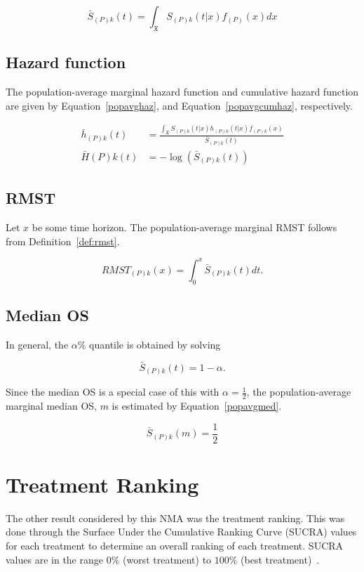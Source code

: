 \begin{equation}
    \bar{S}_{(P)k}(t) = \int_{\mathfrak{X}}S_{(P)k}(t|x)f_{(P)}(x)dx
    \label{popavgS}
\end{equation}

\subsection{Hazard function}

The population-average marginal hazard function and cumulative hazard function are given by Equation~\ref{popavghaz}, and Equation~\ref{popavgcumhaz}, respectively.

\begin{align}
    \bar{h}_{(P)k}(t) &= \frac{\int_{\mathfrak{X}}S_{(P)k}(t|x)h_{(P)k}(t|x)f_{(P)k}(x)}{\bar{S}_{(P)k}(t)} \label{popavghaz}\\
    \bar{H}{(P)k}(t) &= -\log(\bar{S}_{(P)k}(t)) \label{popavgcumhaz}
\end{align}

\subsection{RMST}
Let $x$ be some time horizon. The population-average marginal RMST follows from Definition~\ref{def:rmst}.

\begin{equation}
    RMST_{(P)k}(x) = \int^{x}_{0} \bar{S}_{(P)k}(t)dt.
\end{equation}

\subsection{Median OS}
In general, the $\alpha\%$ quantile is obtained by solving

\begin{equation}
    \bar{S}_{(P)k}(t) = 1 - \alpha.
\end{equation}

Since the median OS is a special case of this with $\alpha = \frac{1}{2}$, the population-average marginal median OS, $m$ is estimated by Equation~\ref{popavgmed}. 

\begin{equation}
    \bar{S}_{(P)k}(m) = \frac{1}{2}
    \label{popavgmed}
\end{equation}

\section{Treatment Ranking}
The other result considered by this NMA was the treatment ranking. This was done through the Surface Under the Cumulative Ranking Curve (SUCRA) values for each treatment to determine an overall ranking of each treatment. SUCRA values are in the range $0\%$ (worst treatment) to $100\%$ (best treatment)~\cite{mbuag}.


